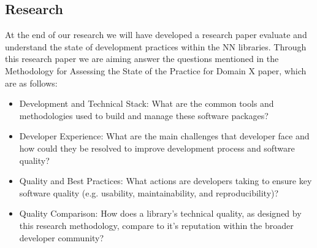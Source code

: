 \documentclass{article}
\begin{document}
\subsection{Research}
At the end of our research we will have developed a research paper evaluate and understand the state of development practices within the NN libraries. Through this research paper we are aiming answer the questions mentioned in the Methodology for Assessing the State of the Practice for Domain X paper, which are as follows:
\begin{itemize}
    \item Development and Technical Stack: What are the common tools and methodologies used to build and manage these software packages?
    \item Developer Experience: What are the main challenges that developer face and how could they be resolved to improve development process and software quality?
    \item Quality and Best Practices: What actions are developers taking to ensure key software quality (e.g. usability, maintainability, and reproducibility)?
    \item Quality Comparison: How does a library's technical quality, as designed by this research methodology, compare to it's reputation within the broader developer community?
\end{itemize}
\end{document}
